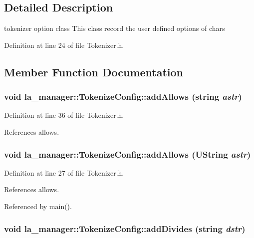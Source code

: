 \subsection{Detailed Description}
tokenizer option class This class record the user defined options of chars 

Definition at line 24 of file Tokenizer.h.

\subsection{Member Function Documentation}
\hypertarget{classla__manager_1_1TokenizeConfig_6f272387b866ec7452108926b2f4d20e}{
\subsubsection[{addAllows}]{\setlength{\rightskip}{0pt plus 5cm}void la\_\-manager::TokenizeConfig::addAllows (string {\em astr})}}
\label{classla__manager_1_1TokenizeConfig_6f272387b866ec7452108926b2f4d20e}




Definition at line 36 of file Tokenizer.h.

References allows.\hypertarget{classla__manager_1_1TokenizeConfig_e47f07d7aa30b9f966819a03624e9225}{
\subsubsection[{addAllows}]{\setlength{\rightskip}{0pt plus 5cm}void la\_\-manager::TokenizeConfig::addAllows (UString {\em astr})}}
\label{classla__manager_1_1TokenizeConfig_e47f07d7aa30b9f966819a03624e9225}




Definition at line 27 of file Tokenizer.h.

References allows.

Referenced by main().\hypertarget{classla__manager_1_1TokenizeConfig_ed3871dcad230dc85505a882bf71924e}{
\subsubsection[{addDivides}]{\setlength{\rightskip}{0pt plus 5cm}void la\_\-manager::TokenizeConfig::addDivides (string {\em dstr})}}
\label{classla__manager_1_1TokenizeConfig_ed3871dcad230dc85505a882bf71924e}




